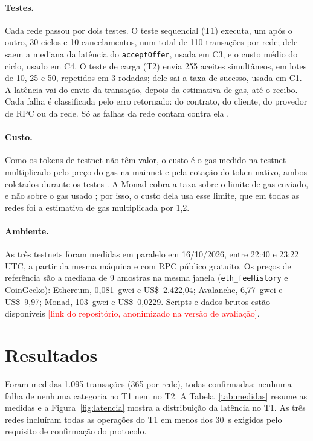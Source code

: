 \documentclass[10pt,a4paper]{article}
\newcommand{\pendente}[1]{\textcolor{red}{[#1]}}
\newcommand{\fn}[1]{\texttt{#1}}
\begin{document}
\paragraph{Testes.} Cada rede passou por dois testes. O teste sequencial (T1) executa, um após o outro, 30 ciclos e 10 cancelamentos, num total de 110 transações por rede; dele saem a mediana da latência do \fn{acceptOffer}, usada em C3, e o custo médio do ciclo, usado em C4. O teste de carga (T2) envia 255 aceites simultâneos, em lotes de 10, 25 e 50, repetidos em 3 rodadas; dele sai a taxa de sucesso, usada em C1. A latência vai do envio da transação, depois da estimativa de gas, até o recibo. Cada falha é classificada pelo erro retornado: do contrato, do cliente, do provedor de RPC ou da rede. Só as falhas da rede contam contra ela \cite{hyperledger2018metrics,lazar2025}.

\paragraph{Custo.} Como os tokens de testnet não têm valor, o custo é o gas medido na testnet multiplicado pelo preço do gas na mainnet e pela cotação do token nativo, ambos coletados durante os testes \cite{ethereum2024gas}. A Monad cobra a taxa sobre o limite de gas enviado, e não sobre o gas usado \cite{monad2024gas}; por isso, o custo dela usa esse limite, que em todas as redes foi a estimativa de gas multiplicada por 1,2.

\paragraph{Ambiente.} As três testnets foram medidas em paralelo em 16/10/2026, entre 22:40 e 23:22 UTC, a partir da mesma máquina e com RPC público gratuito. Os preços de referência são a mediana de 9 amostras na mesma janela (\fn{eth\_feeHistory} e CoinGecko): Ethereum, 0,081~gwei e US\$~2.422,04; Avalanche, 6,77~gwei e US\$~9,97; Monad, 103~gwei e US\$~0,0229. Scripts e dados brutos estão disponíveis \pendente{link do repositório, anonimizado na versão de avaliação}.

\section{Resultados}\label{sec:resultados}

Foram medidas 1.095 transações (365 por rede), todas confirmadas: nenhuma falha de nenhuma categoria no T1 nem no T2. A Tabela~\ref{tab:medidas} resume as medidas e a Figura~\ref{fig:latencia} mostra a distribuição da latência no T1. As três redes incluíram todas as operações do T1 em menos dos 30~s exigidos pelo requisito de confirmação do protocolo.
\end{document}
